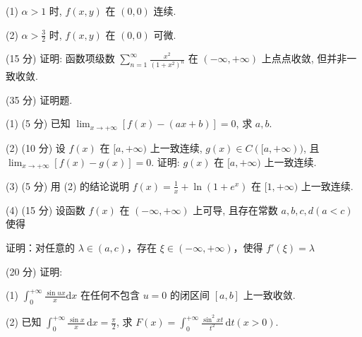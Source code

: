 (1) $\alpha > 1$ 时, $f(x, y)$ 在 $(0, 0)$ 连续.\par
(2) $\alpha > \frac{3}{2}$ 时, $f(x, y)$ 在 $(0, 0)$ 可微.\par
\par{}
(15 分) 证明: 函数项级数 $\sum_{n=1}^{\infty} \frac{x^{2}}{(1 + x^{2})^{n}}$ 在 $(- \infty, +\infty)$ 上点点收敛, 但并非一致收敛.\par
\par{}
(35 分) 证明题.\par
(1) (5 分) 已知 $\lim_{x \to +\infty} [f(x) - (ax + b)] = 0$, 求 $a, b$.\par
(2) (10 分) 设 $f(x)$ 在 $[a, +\infty)$ 上一致连续, $g(x) \in C([a, +\infty))$, 且 $\lim_{x \to +\infty} [f(x) - g(x)] = 0$. 证明: $g(x)$ 在 $[a, +\infty)$ 上一致连续.\par
(3) (5 分) 用 (2) 的结论说明 $f(x) = \frac{1}{x} + \ln (1 + e^x)$ 在 $[1, +\infty)$ 上一致连续.\par
\par{}
(4) (15 分) 设函数 $f(x)$ 在 $(- \infty, +\infty)$ 上可导, 且存在常数 $a, b, c, d (a < c)$ 使得\par
\nopagebreak[4]
证明：对任意的 $\lambda \in (a, c)$，存在 $\xi \in (-\infty, +\infty)$，使得 $f'(\xi) = \lambda$\par
\par{}
(20 分) 证明:\par
(1) $\int_0^{+\infty}\frac{\sin ux}{x}\mathrm{d}x$ 在任何不包含 $u = 0$ 的闭区间 $[a,b]$ 上一致收敛.\par
(2) 已知 $\int_0^{+\infty} \frac{\sin x}{x} \, \mathrm{d}x = \frac{\pi}{2}$, 求 $F(x) = \int_0^{+\infty} \frac{\sin^2 xt}{t^2} \, \mathrm{d}t (x > 0)$.\par
